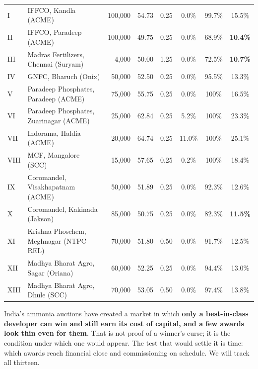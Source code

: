 \begin{center}\tablefont
\begin{tabularx}{\textwidth}{@{}l L r r r c c c@{}}
\toprule
{} &  &  &  &  &  &  & \\ \midrule
I & IFFCO, Kandla (ACME) & 100,000 & 54.73 & 0.25 & 0.0\% & 99.7\% & 15.5\%\\
II & IFFCO, Paradeep (ACME) & 100,000 & 49.75 & 0.25 & 0.0\% & 68.9\% & \textbf{10.4\%}\\
III & Madras Fertilizers, Chennai (Suryam) & 4,000 & 50.00 & 1.25 & 0.0\% & 72.5\% & \textbf{10.7\%}\\
IV & GNFC, Bharuch (Onix) & 50,000 & 52.50 & 0.25 & 0.0\% & 95.5\% & 13.3\%\\
V & Paradeep Phosphates, Paradeep (ACME) & 75,000 & 55.75 & 0.25 & 0.0\% & 100\% & 16.5\%\\
VI & Paradeep Phosphates, Zuarinagar (ACME) & 25,000 & 62.84 & 0.25 & 5.2\% & 100\% & 23.3\%\\
VII & Indorama, Haldia (ACME) & 20,000 & 64.74 & 0.25 & 11.0\% & 100\% & 25.1\%\\
VIII & MCF, Mangalore (SCC) & 15,000 & 57.65 & 0.25 & 0.2\% & 100\% & 18.4\%\\
IX & Coromandel, Visakhapatnam (ACME) & 50,000 & 51.89 & 0.25 & 0.0\% & 92.3\% & 12.6\%\\
X & Coromandel, Kakinada (Jakson) & 85,000 & 50.75 & 0.25 & 0.0\% & 82.3\% & \textbf{11.5\%}\\
XI & Krishna Phoschem, Meghnagar (NTPC REL) & 70,000 & 51.80 & 0.50 & 0.0\% & 91.7\% & 12.5\%\\
XII & Madhya Bharat Agro, Sagar (Oriana) & 60,000 & 52.25 & 0.25 & 0.0\% & 94.4\% & 13.0\%\\
XIII & Madhya Bharat Agro, Dhule (SCC) & 70,000 & 53.05 & 0.50 & 0.0\% & 97.4\% & 13.8\%\\
\bottomrule
\end{tabularx}
\end{center}

\begin{finding}
India's ammonia auctions have created a market in which \textbf{only a best-in-class developer can win and still earn its cost of capital, and a few awards look thin even for them}. That is not proof of a winner's curse; it is the condition under which one would appear. The test that would settle it is time: which awards reach financial close and commissioning on schedule. We will track all thirteen. \confM
\end{finding}

